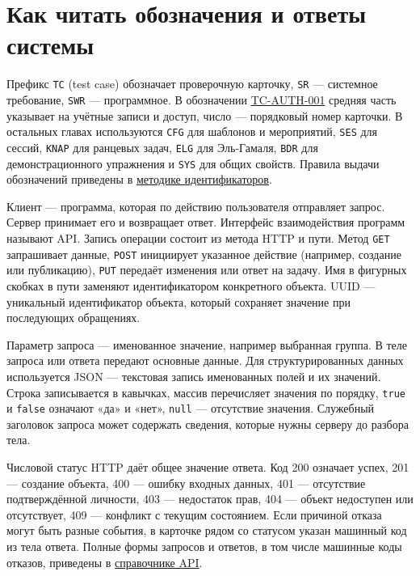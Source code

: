 \documentclass[12pt,a4paper]{article}
\begin{document}
\section{Как читать обозначения и ответы системы}\label{ux43aux430ux43a-ux447ux438ux442ux430ux442ux44c-ux43eux431ux43eux437ux43dux430ux447ux435ux43dux438ux44f-ux438-ux43eux442ux432ux435ux442ux44b-ux441ux438ux441ux442ux435ux43cux44b}

\hypertarget{как-читать-обозначения-и-ответы-системы}{}

Префикс \texttt{TC} (test case) обозначает проверочную карточку, \texttt{SR} --- системное требование, \texttt{SWR} --- программное. В обозначении {\hyperlink{tc-auth-001}{TC-AUTH-001}} средняя часть указывает на учётные записи и доступ, число --- порядковый номер карточки. В остальных главах используются \texttt{CFG} для шаблонов и мероприятий, \texttt{SES} для сессий, \texttt{KNAP} для ранцевых задач, \texttt{ELG} для Эль-Гамаля, \texttt{BDR} для демонстрационного упражнения и \texttt{SYS} для общих свойств. Правила выдачи обозначений приведены в {\href{../notes/methodology/Методика\_идентификаторов.pdf\#методика-идентификаторов}{методике идентификаторов}}.

Клиент --- программа, которая по действию пользователя отправляет запрос. Сервер принимает его и возвращает ответ. Интерфейс взаимодействия программ называют API. Запись операции состоит из метода HTTP и пути. Метод \texttt{GET} запрашивает данные, \texttt{POST} инициирует указанное действие (например, создание или публикацию), \texttt{PUT} передаёт изменения или ответ на задачу. Имя в фигурных скобках в пути заменяют идентификатором конкретного объекта. UUID --- уникальный идентификатор объекта, который сохраняет значение при последующих обращениях.

Параметр запроса --- именованное значение, например выбранная группа. В теле запроса или ответа передают основные данные. Для структурированных данных используется JSON --- текстовая запись именованных полей и их значений. Строка записывается в кавычках, массив перечисляет значения по порядку, \texttt{true} и \texttt{false} означают «да» и «нет», \texttt{null} --- отсутствие значения. Служебный заголовок запроса может содержать сведения, которые нужны серверу до разбора тела.

Числовой статус HTTP даёт общее значение ответа. Код 200 означает успех, 201 --- создание объекта, 400 --- ошибку входных данных, 401 --- отсутствие подтверждённой личности, 403 --- недостаток прав, 404 --- объект недоступен или отсутствует, 409 --- конфликт с текущим состоянием. Если причиной отказа могут быть разные события, в карточке рядом со статусом указан машинный код из тела ответа. Полные формы запросов и ответов, в том числе машинные коды отказов, приведены в {\href{../09\_Архитектура\_и\_API/DOC-08\_Справочник\_API.pdf\#doc-08-справочник-api-платформы}{справочнике API}}.
\end{document}
